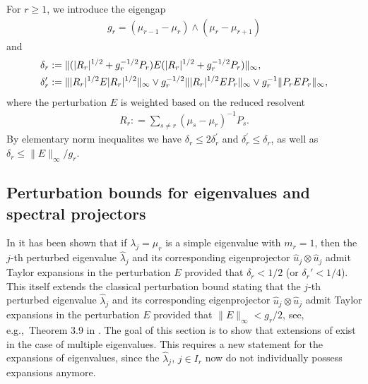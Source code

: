 \documentclass[a4paper,11pt]{article} %
\numberwithin{equation}{section}
\theoremstyle{definition}
\theoremstyle{remark}
\theoremstyle{plain}
\begin{document}
For $r\geq 1$, we introduce the eigengap  
\begin{align} g_{r} = (\mu_{r - 1} - \mu_{r}) \land (\mu_{r} - \mu_{r + 1})\end{align} 
and
\begin{align}
  \delta_{r} &: = \| ( | R_{r} |^{ 1 / 2 } + g_{r}^{ - 1 / 2 } P_{r} ) E 
                     ( | R_{r} |^{ 1 / 2 } + g_{r}^{ - 1 / 2 } P_{r} )
                  \|_{ \infty }, 
  \\
  \delta_{r}' &: =              \| |R_{r}|^{1/2} E |R_{r}|^{1/2} \|_{\infty}
              \lor g_{r}^{-1/2} \| |R_{r}|^{1/2} E  P_{r}        \|_{\infty}
              \lor g_{r}^{-1}   \|  P_{r}        E  P_{r}        \|_{\infty},
  \notag
\end{align}
where the perturbation \( E \) is weighted based on the reduced resolvent
\begin{align}
  R_{r}: = \sum_{ s \ne r } ( \mu_{s} - \mu_{r} )^{-1} P_{s}.
\end{align}
By elementary norm inequalites we have $\delta_r\leq 2\delta_r^\prime$ and  $\delta_r^\prime\leq \delta_r$, as well as $\delta_r\leq \|E\|_\infty/g_r$.



\subsection{Perturbation bounds for eigenvalues and spectral projectors}%
\label{ssec_PerturbationSeriesForSpectralProjectors}

In \cite{Wahl2026PertubationExpansionsI} it has been shown that if $\lambda_j=\mu_r$ is a simple eigenvalue with $m_r = 1$, then the \( j \)-th perturbed eigenvalue \( \widehat{\lambda}_{j} \) and its corresponding eigenprojector \( \widehat{u}_{j} \otimes \widehat{u}_{j} \) admit Taylor expansions in the perturbation \( E \) provided that $\delta_r < 1/2$ (or $\delta_r' < 1/4$). This itself extends the classical perturbation bound stating that the \( j \)-th perturbed eigenvalue \( \widehat{\lambda}_{j} \) and its corresponding eigenprojector \( \widehat{u}_{j} \otimes \widehat{u}_{j} \) admit Taylor expansions in the perturbation \( E \) provided that \( \| E \|_{\infty} < g_r / 2 \), see, e.g.,~Theorem 3.9 in \cite{MR1335452}. The goal of this section is to show that extensions of \cite{Wahl2026PertubationExpansionsI} exist in the case of  multiple eigenvalues. This requires a new statement for the expansions of eigenvalues, since the \( \widehat{\lambda}_{j} \), \( j \in I_{r} \) now do not individually possess expansions anymore. 
\end{document}
